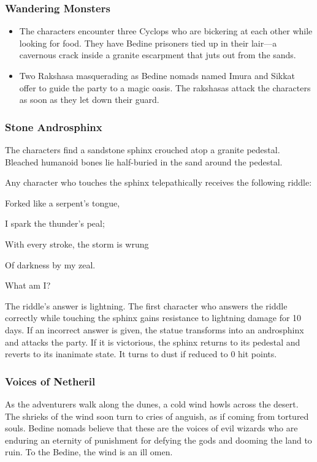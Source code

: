 \documentclass[10pt,a4paper,twoside,bg=print,twocolumn,openany,nodeprecatedcode]{dndbook}
\begin{document}
\subsubsection{Wandering Monsters}

\begin{itemize}
\item The characters encounter three Cyclops who are bickering at each other while looking for food. They have Bedine prisoners tied up in their lair—a cavernous crack inside a granite escarpment that juts out from the sands.
\item Two Rakshasa masquerading as Bedine nomads named Imura and Sikkat offer to guide the party to a magic oasis. The rakshasas attack the characters as soon as they let down their guard.
\end{itemize}

\subsubsection{Stone Androsphinx}
The characters find a sandstone sphinx crouched atop a granite pedestal. Bleached humanoid bones lie half-buried in the sand around the pedestal.

Any character who touches the sphinx telepathically receives the following riddle:

\begin{DndReadAloud}{}
Forked like a serpent's tongue,

I spark the thunder's peal;

With every stroke, the storm is wrung

Of darkness by my zeal.

What am I?

\end{DndReadAloud}

The riddle's answer is lightning. The first character who answers the riddle correctly while touching the sphinx gains resistance to lightning damage for 10 days. If an incorrect answer is given, the statue transforms into an androsphinx and attacks the party. If it is victorious, the sphinx returns to its pedestal and reverts to its inanimate state. It turns to dust if reduced to 0 hit points.

\subsubsection{Voices of Netheril}
As the adventurers walk along the dunes, a cold wind howls across the desert. The shrieks of the wind soon turn to cries of anguish, as if coming from tortured souls. Bedine nomads believe that these are the voices of evil wizards who are enduring an eternity of punishment for defying the gods and dooming the land to ruin. To the Bedine, the wind is an ill omen.
\end{document}
